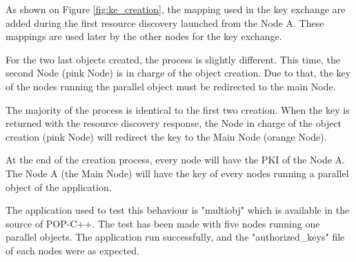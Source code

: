 As shown on Figure \ref{fig:ke_creation}, the mapping used in the key exchange are added during the first resource discovery launched from the Node A. These mappings are used later by the other nodes for the key exchange.\s

For the two last objects created, the process is slightly different. This time, the second Node (pink Node) is in charge of the object creation. Due to that, the key of the nodes running the parallel object must be redirected to the main Node. \s

The majority of the process is identical to the first two creation. When the key is returned with the resource discovery response, the Node in charge of the object creation (pink Node) will redirect the key to the Main Node (orange Node). \s

At the end of the creation process, every node will have the PKI of the Node A. The Node A (the Main Node) will have the key of every nodes running a parallel object of the application.\s

The application used to test this behaviour is "multiobj" which is available in the source of POP-C++. The test has been made with five nodes running one parallel objects. The application run successfully, and the "authorized\_keys" file of each nodes were as expected. 

